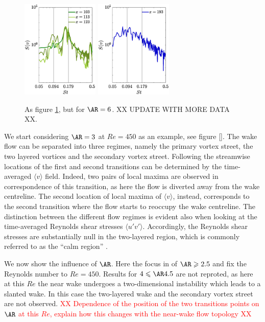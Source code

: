 \begin{figure}
\includegraphics[width=0.328\textwidth]{./fig/appendix/Spec_AR6_Re450_b.eps}
\includegraphics[width=0.328\textwidth]{./fig/appendix/Spec_AR6_Re450_c.eps}
\caption{As figure \ref{fig:wake_AR6}, but for $\AR=6$. XX UPDATE WITH MORE DATA XX.}
\label{fig:wake_AR6}
\end{figure}

We start considering $\AR=3$ at $Re=450$ as an example, see figure \ref{}. The wake flow can be separated into three regimes, namely the primary vortex street, the two layered vortices and the secondary vortex street. Following \cite{jiang-cheng-2019} the streamwise locations of the first and second transitions can be determined by the time-averaged $\langle v \rangle$ field. Indeed, two pairs of local maxima are observed in correspondence of this transition, as here the flow is diverted away from the wake centreline. The second location of local maxima of $\langle v \rangle$, instead, corresponds to the second transition where the flow starts to reoccupy the wake centreline. The distinction between the different flow regimes is evident also when looking at the time-averaged Reynolds shear stresses $\langle u'v' \rangle$. Accordingly, the Reynolds shear stresses are substantially null in the two-layered region, which is commonly referred to as the ``calm region'' \citep{durgin-karlsson-1971}.

We now show the influence of $\AR$. Here the focus in of $\AR \ge 2.5$ and fix the Reynolds number to $Re=450$. Results for $4 \le \AR 4.5$ are not reproted, as here at this $Re$ the near wake undergoes a two-dimensional instability which leads to a slanted wake. In this case the two-layered wake and the secondary vortex street are not observed. \textcolor{red}{XX Dependence of the position of the two transitions points on $\AR$ at this $Re$, explain how this changes with the near-wake flow topology XX}

